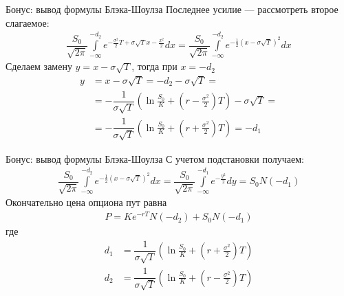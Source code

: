 \documentclass[pdf,12pt]{beamer}
\begin{document}
\begin{frame}{Бонус: вывод формулы Блэка-Шоулза}
Последнее усилие --- рассмотреть второе слагаемое:
\begin{align*}
\dfrac{S_0}{\sqrt{2\pi}} \int\limits_{-\infty}^{-d_2}e^{-\frac{\sigma^2}{2}T + \sigma\sqrt{T}x -\frac{x^2}{2}}dx
=
\dfrac{S_0}{\sqrt{2\pi}} \int\limits_{-\infty}^{-d_2}e^{-\frac{1}{2}(x - \sigma\sqrt{T})^2}dx
\end{align*}
Сделаем замену $y = x - \sigma\sqrt{T}$, тогда при $x=-d_2$
\begin{align*}
y &= x - \sigma\sqrt{T} = -d_2 - \sigma\sqrt{T} = \\
&= -\dfrac{1}{\sigma\sqrt{T}}\left(\ln\frac{S_0}{K} + \left(r - \frac{\sigma^2}{2}\right)T \right) - \sigma\sqrt{T} = \\
&= -\dfrac{1}{\sigma\sqrt{T}}\left(\ln\frac{S_0}{K} + \left(r + \frac{\sigma^2}{2}\right)T \right) = -d_1
\end{align*}
\end{frame}

\begin{frame}{Бонус: вывод формулы Блэка-Шоулза}
С учетом подстановки получаем:
\begin{align*}
\dfrac{S_0}{\sqrt{2\pi}} \int\limits_{-\infty}^{-d_2}e^{-\frac{1}{2}(x - \sigma\sqrt{T})^2}dx
=
\dfrac{S_0}{\sqrt{2\pi}} \int\limits_{-\infty}^{-d_1}e^{-\frac{y^2}{2}}dy
=
S_0N(-d_1)
\end{align*}
Окончательно цена опциона пут равна
\begin{align*}
P = Ke^{-rT}N(-d_2) + S_0N(-d_1)
\end{align*}
где
\begin{align*}
d_1 &= \dfrac{1}{\sigma\sqrt{T}}\left(\ln\frac{S_0}{K} + \left(r + \frac{\sigma^2}{2}\right)T \right) \\
d_2 &= \dfrac{1}{\sigma\sqrt{T}}\left(\ln\frac{S_0}{K} + \left(r - \frac{\sigma^2}{2}\right)T \right)
\end{align*}
\end{frame}
\end{document}
